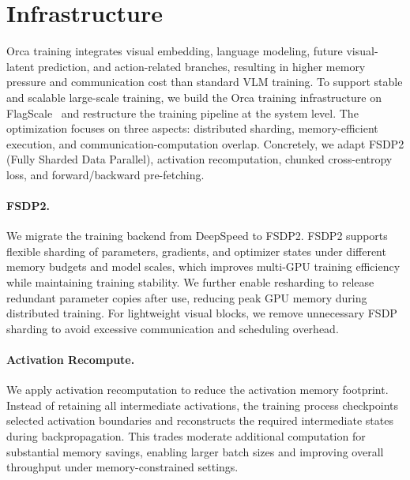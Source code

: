 \documentclass{llmxive}
\providecommand{\currentnavsection}{sec:intro}
\providecommand{\setnavsection}[1]{  \gdef\currentnavsection{#1}}
\providecommand{\thefigure}{A\arabic{figure}}
\providecommand{\theHfigure}{A\arabic{figure}}
\providecommand{\thetable}{A\arabic{table}}
\providecommand{\theHtable}{A\arabic{table}}
\begin{document}
\section{Infrastructure}\label{sec:appendix_infrastructure}
\setnavsection{sec:appendix_infrastructure}

\renewcommand{\thefigure}{D\arabic{figure}}
\renewcommand{\theHfigure}{D\arabic{figure}}
\setcounter{figure}{0}

\renewcommand{\thetable}{D\arabic{table}}
\renewcommand{\theHtable}{D\arabic{table}}
\setcounter{table}{0}

Orca training integrates visual embedding, language modeling, future visual-latent prediction, and action-related branches, resulting in higher memory pressure and communication cost than standard VLM training. To support stable and scalable large-scale training, we build the Orca training infrastructure on FlagScale~\citep{flagscale} and restructure the training pipeline at the system level. The optimization focuses on three aspects: distributed sharding, memory-efficient execution, and communication-computation overlap. Concretely, we adapt FSDP2 (Fully Sharded Data Parallel), activation recomputation, chunked cross-entropy loss, and forward/backward pre-fetching.



\paragraph{FSDP2.} 
We migrate the training backend from DeepSpeed to FSDP2. FSDP2 supports flexible sharding of parameters, gradients, and optimizer states under different memory budgets and model scales, which improves multi-GPU training efficiency while maintaining training stability. We further enable resharding to release redundant parameter copies after use, reducing peak GPU memory during distributed training. For lightweight visual blocks, we remove unnecessary FSDP sharding to avoid excessive communication and scheduling overhead.


\paragraph{Activation Recompute.} 
We apply activation recomputation to reduce the activation memory footprint. Instead of retaining all intermediate activations, the training process checkpoints selected activation boundaries and reconstructs the required intermediate states during backpropagation. This trades moderate additional computation for substantial memory savings, enabling larger batch sizes and improving overall throughput under memory-constrained settings.
\end{document}
